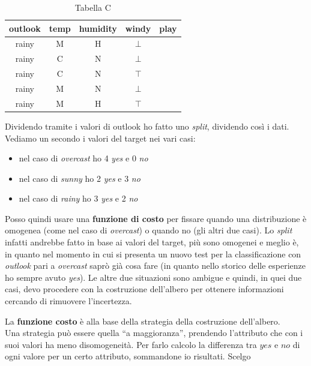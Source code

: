 \documentclass[a4paper,12pt, oneside]{book}
\begin{document}
\begin{esempio}
\begin{table}[H]
  \end{table}
  \begin{table}[H]
    \centering
    \begin{tabular}{c|c|c|c|c}
      outlook & temp & humidity & windy & play\\
      \hline
      rainy & M & H & $\bot$ & \color{darkgreen}{yes}\\
      rainy & C & N & $\bot$ & \color{darkgreen}{yes}\\
      rainy & C & N & $\top$ & \color{red}{no}\\
      rainy & M & N & $\bot$ & \color{darkgreen}{yes}\\
      rainy & M & H & $\top$ & \color{red}{no}
    \end{tabular}
    \caption{Tabella C}
  \end{table}
  Dividendo tramite i valori di outlook ho fatto uno \textit{split}, dividendo
  così i dati.\\
  Vediamo un secondo i valori del target nei vari casi:
  \begin{itemize}
    \item nel caso di \textit{overcast} ho 4 \textit{yes} e 0 \textit{no}
    \item nel caso di \textit{sunny} ho 2 \textit{yes} e 3 \textit{no}
    \item nel caso di \textit{rainy} ho 3 \textit{yes} e 2 \textit{no}
  \end{itemize}
  Posso quindi usare una \textbf{funzione di costo} per fissare quando una
  distribuzione è omogenea (come nel caso di \textit{overcast}) o quando no (gli
  altri due casi). Lo \textit{split} infatti andrebbe fatto in base ai valori
  del target, più sono omogenei e meglio è, in quanto nel momento in cui si
  presenta un nuovo test per la classificazione con \textit{outlook} pari a
  \textit{overcast} saprò già cosa fare (in quanto nello storico delle
  esperienze ho sempre avuto \textit{yes}). Le altre due situazioni sono
  ambigue e quindi, in quei due casi, devo procedere con la costruzione
  dell'albero per ottenere informazioni cercando di rimuovere l'incertezza.  
\end{esempio}
La \textbf{funzione costo} è alla base della strategia della costruzione
dell'albero.\\
Una strategia può essere quella ``a maggioranza'', prendendo l'attributo che con
i suoi valori ha meno disomogeneità. Per farlo calcolo la differenza tra $yes$ e
$no$ di ogni valore per un certo attributo, sommandone io risultati. Scelgo
\end{document}
